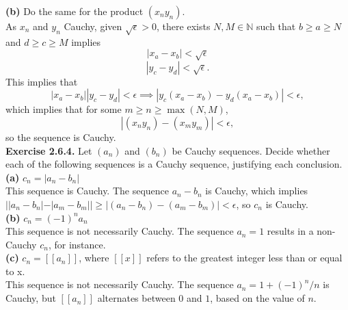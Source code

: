 \documentclass[12pt,letterpaper]{article}
\begin{document}
\textbf{(b)} Do the same for the product \((x_{n}y_{n})\). \\

As \(x_{n}\) and \(y_{n}\) Cauchy, given \(\sqrt{\epsilon} > 0\), there exists \(N,M \in \mathbb{N}\) such that \(b \geq a \geq N\) and \(d \geq c \geq M\) implies \[|x_{a}-x_{b}| < \sqrt{\epsilon}\]\[|y_{c} - y_{d}| < \sqrt{\epsilon}.\] This implies that \[|x_{a}-x_{b}||y_{c}-y_{d}| < \epsilon \implies  |y_{c}(x_{a} - x_{b}) - y_{d}(x_{a} - x_{b})| < \epsilon,\] which implies that for some \(m \geq n \geq \max(N,M)\), \[|(x_{n}y_{n}) - (x_{m}y_{m})| < \epsilon,\] so the sequence is Cauchy. \\

\textbf{Exercise 2.6.4.} Let \((a_{n})\) and \((b_{n})\) be Cauchy sequences. Decide whether each of the following sequences is a Cauchy sequence, justifying each conclusion. \\

\textbf{(a)} \(c_{n} = |a_{n} - b_{n}| \) \\

This sequence is Cauchy. The sequence \(a_{n}-b_{n}\) is Cauchy, which implies \(||a_{n} - b_{n}| - |a_{m} - b_{m}|| \geq |(a_{n} - b_{n}) - (a_{m} - b_{m})| < \epsilon\), so \(c_{n}\) is Cauchy. \\

\textbf{(b)}  \(c_{n} = (-1)^{n}a_{n}\) \\

This sequence is not necessarily Cauchy. The sequence \(a_{n} = 1\) results in a non-Cauchy \(c_{n}\), for instance. \\

\textbf{(c)} \(c_{n} = [[a_{n}]]\), where \([[x]]\) refers to the greatest integer less than or equal to x. \\

This sequence is not necessarily Cauchy. The sequence \(a_{n} = 1 + (-1)^{n}/n\) is Cauchy, but \([[a_{n}]]\) alternates between \(0\) and \(1\), based on the value of \(n\). \\
\end{document}
